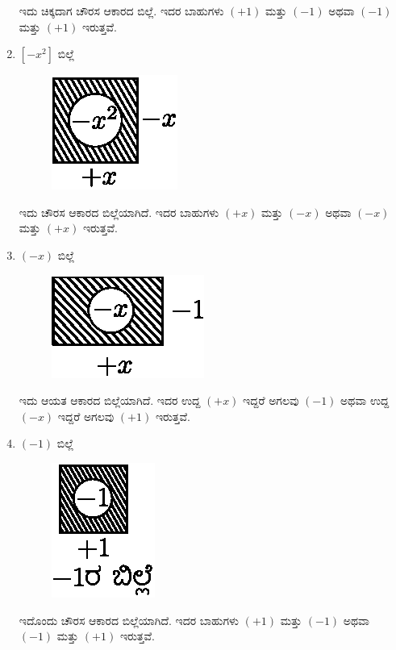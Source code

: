 \begin{enumerate}
ಇದು ಚಿಕ್ಕದಾಗ ಚೌರಸ ಆಕಾರದ ಬಿಲ್ಲೆ. ಇದರ ಬಾಹುಗಳು $(+1)$ ಮತ್ತು $(-1)$ ಅಥವಾ $(-1)$ ಮತ್ತು $(+1)$ ಇರುತ್ತವೆ.

\item $[-x^2]$ ಬಿಲ್ಲೆ  
\begin{figure}[H]
\centering
\includegraphics[scale=0.8]{src/figure/chap3/fig3-4d.eps}
\end{figure}

ಇದು ಚೌರಸ ಆಕಾರದ ಬಿಲ್ಲೆಯಾಗಿದೆ. ಇದರ ಬಾಹುಗಳು $(+x)$ ಮತ್ತು $(-x)$ ಅಥವಾ $(-x)$ ಮತ್ತು $(+x)$ ಇರುತ್ತವೆ.

\item $(-x)$ ಬಿಲ್ಲೆ 
\begin{figure}[H]
\centering
\includegraphics[scale=0.8]{src/figure/chap3/fig3-4e.eps}
\end{figure}

ಇದು ಆಯತ ಆಕಾರದ ಬಿಲ್ಲೆಯಾಗಿದೆ. ಇದರ ಉದ್ದ $(+x)$ ಇದ್ದರೆ ಅಗಲವು $(-1)$ ಅಥವಾ ಉದ್ದ $(-x)$ ಇದ್ದರೆ ಅಗಲವು $(+1)$ ಇರುತ್ತವೆ.

\item $(-1)$ ಬಿಲ್ಲೆ 
\begin{figure}[H]
\centering
\includegraphics[scale=0.8]{src/figure/chap3/fig3-4f.eps}
\end{figure}

ಇದೊಂದು ಚೌರಸ ಆಕಾರದ ಬಿಲ್ಲೆಯಾಗಿದೆ. ಇದರ ಬಾಹುಗಳು $(+1)$ ಮತ್ತು $(-1)$ ಅಥವಾ $(-1)$ ಮತ್ತು $(+1)$ ಇರುತ್ತವೆ. 
\end{enumerate}

